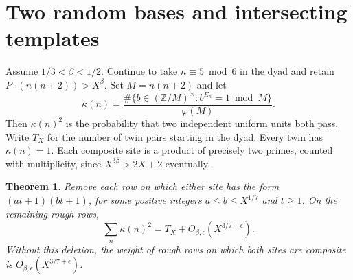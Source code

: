 \documentclass[11pt]{article}
\newtheorem{theorem}{Theorem}[section]
\begin{document}
\section{Two random bases and intersecting templates}
Assume \(1/3<\beta<1/2\). Continue to take \(n\equiv5\bmod6\) in the
dyad and retain \(P^-(n(n+2))>X^\beta\). Set \(M=n(n+2)\) and let
\[
 \kappa(n)=
 \frac{\#\{b\in(\mathbb Z/M)^\times:b^{E_n}=1\bmod M\}}{\varphi(M)} .
\]
Then \(\kappa(n)^2\) is the probability that two independent uniform
units both pass. Write \(T_X\) for the number of twin pairs starting
in the dyad. Every twin has \(\kappa(n)=1\). Each composite site is
a product of precisely two primes, counted with multiplicity, since
\(X^{3\beta}>2X+2\) eventually.
\begin{theorem}\label{thm:templates}
Remove each row on which either site has the form
\((at+1)(bt+1)\), for some positive integers \(a\le b\le X^{1/7}\)
and \(t\ge1\). On the remaining rough rows,
\[
 \sum_n\kappa(n)^2=T_X+O_{\beta,\epsilon}(X^{3/7+\epsilon}).
\]
Without this deletion, the weight of rough rows on which both sites
are composite is \(O_{\beta,\epsilon}(X^{3/7+\epsilon})\).
\end{theorem}
\end{document}
